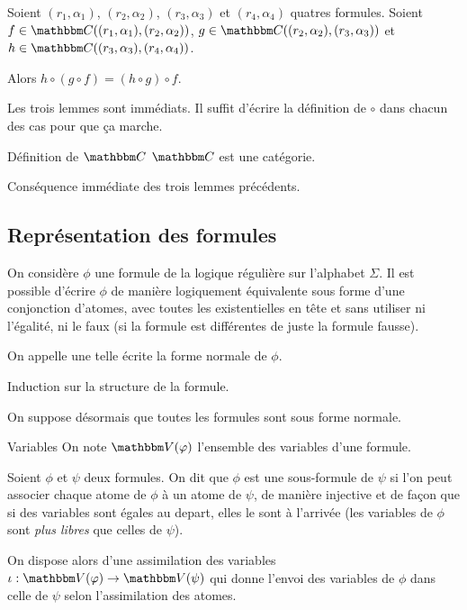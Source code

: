 \begin{lem}
    Soient $(r_1,\alpha_1)$, $(r_2,\alpha_2)$, $(r_3,\alpha_3)$ et $(r_4,\alpha_4)$
    quatres formules.
    Soient $f\in\C((r_1,\alpha_1), (r_2,\alpha_2))$,
    $g\in\C((r_2,\alpha_2), (r_3,\alpha_3))$ et $h\in\C((r_3,\alpha_3),(r_4,\alpha_4))$.

    Alors $h\circ(g\circ f) = (h\circ g)\circ f$.
\end{lem}

\begin{pv} Les trois lemmes sont immédiats. Il suffit d'écrire la définition de $\circ$
    dans chacun des cas pour que ça marche.
\end{pv}

\begin{theo}{Définition de $\C$}
    $\C$ est une catégorie.
\end{theo}

\begin{pv} Conséquence immédiate des trois lemmes précédents.
\end{pv}

\subsection{Représentation des formules}

\begin{lem}
    On considère $\phi$ une formule de la logique régulière sur l'alphabet
    $\Sigma$.  Il est possible d'écrire $\phi$ de manière logiquement
    équivalente sous forme d'une conjonction d'atomes, avec toutes les
    existentielles en tête et sans utiliser ni l'égalité, ni le faux (si la
    formule est différentes de juste la formule fausse).

    On appelle une telle écrite la forme normale de $\phi$.
\end{lem}

\begin{pv} Induction sur la structure de la formule.
\end{pv}

On suppose désormais que toutes les formules sont sous forme normale.

\begin{defi}{Variables}
    On note $\V(\phi)$ l'ensemble des variables d'une formule.
\end{defi}

\begin{rem}
    Soient $\phi$ et $\psi$ deux formules. On dit que $\phi$ est une sous-formule
    de $\psi$ si l'on peut associer chaque atome de $\phi$ à un atome de $\psi$, de
    manière injective et de façon que si des variables sont égales au depart, elles
    le sont à l'arrivée (les variables de $\phi$ sont \emph{plus libres} que celles
    de $\psi$).

    On dispose alors d'une assimilation des variables
    $\iota : \V(\phi)\rightarrow \V(\psi)$ qui donne l'envoi des variables de $\phi$
    dans celle de $\psi$ selon l'assimilation des atomes.
\end{rem}

